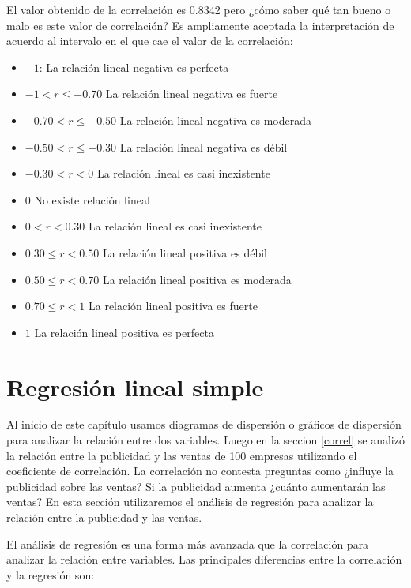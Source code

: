 \documentclass[
]{krantz}
\providecommand{\tightlist}{%
  \setlength{\itemsep}{0pt}\setlength{\parskip}{0pt}}
\begin{document}
El valor obtenido de la correlación es 0.8342 pero ¿cómo saber qué tan bueno o malo es este valor de correlación? Es ampliamente aceptada la interpretación de acuerdo al intervalo en el que cae el valor de la correlación:

\begin{itemize}
\tightlist
\item
  \(-1\): La relación lineal negativa es perfecta
\item
  \(-1<r \leq -0.70\) La relación lineal negativa es fuerte
\item
  \(-0.70<r \leq -0.50\) La relación lineal negativa es moderada
\item
  \(-0.50<r \leq -0.30\) La relación lineal negativa es débil
\item
  \(-0.30<r < 0\) La relación lineal es casi inexistente
\item
  \(0\) No existe relación lineal
\item
  \(0<r < 0.30\) La relación lineal es casi inexistente
\item
  \(0.30 \leq r < 0.50\) La relación lineal positiva es débil
\item
  \(0.50 \leq r < 0.70\) La relación lineal positiva es moderada
\item
  \(0.70 \leq r < 1\) La relación lineal positiva es fuerte
\item
  \(1\) La relación lineal positiva es perfecta
\end{itemize}

\hypertarget{lineal}{%
\section{Regresión lineal simple}\label{lineal}}

Al inicio de este capítulo usamos diagramas de dispersión o gráficos de dispersión para analizar la relación entre dos variables. Luego en la seccion \ref{correl} se analizó la relación entre la publicidad y las ventas de 100 empresas utilizando el coeficiente de correlación. La correlación no contesta preguntas como ¿influye la publicidad sobre las ventas? Si la publicidad aumenta ¿cuánto aumentarán las ventas? En esta sección utilizaremos el análisis de regresión para analizar la relación entre la publicidad y las ventas.

El análisis de regresión es una forma más avanzada que la correlación para analizar la relación entre variables. Las principales diferencias entre la correlación y la regresión son:
\end{document}
